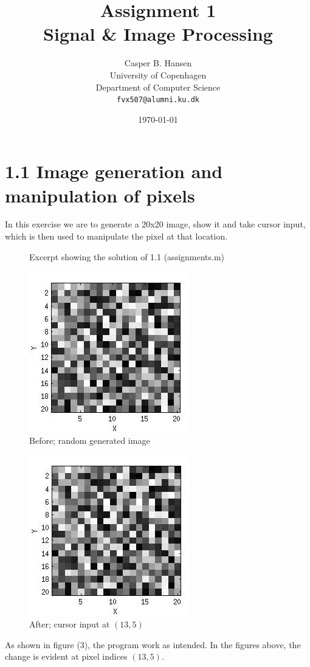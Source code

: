 \documentclass[11pt]{article}
\title
{
    {\Large Assignment 1} \\
    Signal \& Image Processing
}
\author
{
    Casper B. Hansen\\
    University of Copenhagen\\
    Department of Computer Science\\
    {\tt fvx507@alumni.ku.dk}
}
\date{\today}
\newcommand{\codefig}[5]
{
\begin{figure}[H]
    
    \caption{#5 (#2)}
    \label{code:#1}
\end{figure}
}
\begin{document}
\maketitle


\section{1.1 \mdseries Image generation and manipulation of pixels}
\label{sec:1-1}
In this exercise we are to generate a 20x20 image, show it and take cursor
input, which is then used to manipulate the pixel at that location.

\codefig{1-1}{assignments.m}{7}{19}{Excerpt showing the solution of 1.1}


\begin{multicols}{3}
    
    \begin{figure}[H]
        \center
        \includegraphics[scale=0.5]{figures/1-1_before.jpg}
        \caption{Before; random generated image}
    \end{figure}
    
    \columnbreak
    
    \begin{figure}[H]
        \center
        \includegraphics[scale=0.5]{figures/1-1_after.jpg}
        \caption{After; cursor input at $(13,5)$}
    \end{figure}

    \columnbreak
    
    As shown in figure (3), the program work as intended. In the figures
    above, the change is evident at pixel indices $(13,5)$.

\end{multicols}
\end{document}
